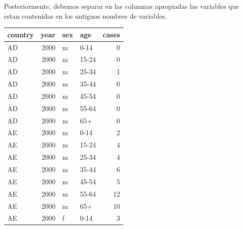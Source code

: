 \documentclass[]{article}
\begin{document}
Posteriormente, debemos separar en las columnas apropiadas las variables
que estan contenidas en los antiguos nombres de variables.

\begin{table}[ht]
\centering
\begin{tabular}{lrllr}
  \hline
country & year & sex & age & cases \\ 
  \hline
AD & 2000 & m & 0-14 &   0 \\ 
  AD & 2000 & m & 15-24 &   0 \\ 
  AD & 2000 & m & 25-34 &   1 \\ 
  AD & 2000 & m & 35-44 &   0 \\ 
  AD & 2000 & m & 45-54 &   0 \\ 
  AD & 2000 & m & 55-64 &   0 \\ 
  AD & 2000 & m & 65+ &   0 \\ 
  AE & 2000 & m & 0-14 &   2 \\ 
  AE & 2000 & m & 15-24 &   4 \\ 
  AE & 2000 & m & 25-34 &   4 \\ 
  AE & 2000 & m & 35-44 &   6 \\ 
  AE & 2000 & m & 45-54 &   5 \\ 
  AE & 2000 & m & 55-64 &  12 \\ 
  AE & 2000 & m & 65+ &  10 \\ 
  AE & 2000 & f & 0-14 &   3 \\ 
   \hline
\end{tabular}
\end{table}
\end{document}
